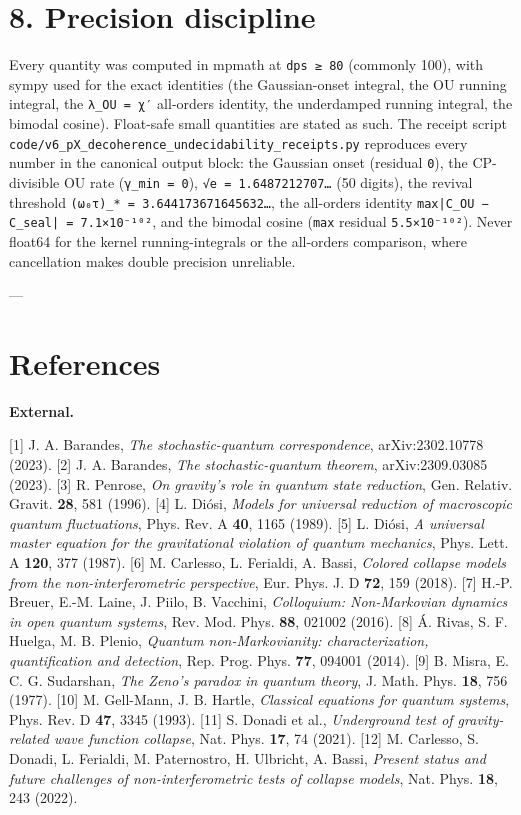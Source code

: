 \documentclass[11pt]{article}
\begin{document}
\section*{8. Precision discipline}
Every quantity was computed in mpmath at \texttt{dps ≥ 80} (commonly 100), with sympy used for the exact identities (the Gaussian-onset integral, the OU running integral, the \texttt{λ\_OU = χ′} all-orders identity, the underdamped running integral, the bimodal cosine). Float-safe small quantities are stated as such. The receipt script \texttt{code/v6\_pX\_decoherence\_undecidability\_receipts.py} reproduces every number in the canonical output block: the Gaussian onset (residual \texttt{0}), the CP-divisible OU rate (\texttt{γ\_min = 0}), \texttt{√e = 1.6487212707…} (50 digits), the revival threshold \texttt{(ω₀τ)\_* = 3.644173671645632…}, the all-orders identity \texttt{max|C\_OU − C\_seal| = 7.1×10⁻¹⁰²}, and the bimodal cosine (\texttt{max} residual \texttt{5.5×10⁻¹⁰²}). Never float64 for the kernel running-integrals or the all-orders comparison, where cancellation makes double precision unreliable.

---

\section*{References}
\textbf{External.}

[1] J. A. Barandes, \emph{The stochastic-quantum correspondence}, arXiv:2302.10778 (2023). [2] J. A. Barandes, \emph{The stochastic-quantum theorem}, arXiv:2309.03085 (2023). [3] R. Penrose, \emph{On gravity's role in quantum state reduction}, Gen. Relativ. Gravit. \textbf{28}, 581 (1996). [4] L. Diósi, \emph{Models for universal reduction of macroscopic quantum fluctuations}, Phys. Rev. A \textbf{40}, 1165 (1989). [5] L. Diósi, \emph{A universal master equation for the gravitational violation of quantum mechanics}, Phys. Lett. A \textbf{120}, 377 (1987). [6] M. Carlesso, L. Ferialdi, A. Bassi, \emph{Colored collapse models from the non-interferometric perspective}, Eur. Phys. J. D \textbf{72}, 159 (2018). [7] H.-P. Breuer, E.-M. Laine, J. Piilo, B. Vacchini, \emph{Colloquium: Non-Markovian dynamics in open quantum systems}, Rev. Mod. Phys. \textbf{88}, 021002 (2016). [8] Á. Rivas, S. F. Huelga, M. B. Plenio, \emph{Quantum non-Markovianity: characterization, quantification and detection}, Rep. Prog. Phys. \textbf{77}, 094001 (2014). [9] B. Misra, E. C. G. Sudarshan, \emph{The Zeno's paradox in quantum theory}, J. Math. Phys. \textbf{18}, 756 (1977). [10] M. Gell-Mann, J. B. Hartle, \emph{Classical equations for quantum systems}, Phys. Rev. D \textbf{47}, 3345 (1993). [11] S. Donadi et al., \emph{Underground test of gravity-related wave function collapse}, Nat. Phys. \textbf{17}, 74 (2021). [12] M. Carlesso, S. Donadi, L. Ferialdi, M. Paternostro, H. Ulbricht, A. Bassi, \emph{Present status and future challenges of non-interferometric tests of collapse models}, Nat. Phys. \textbf{18}, 243 (2022).
\end{document}
